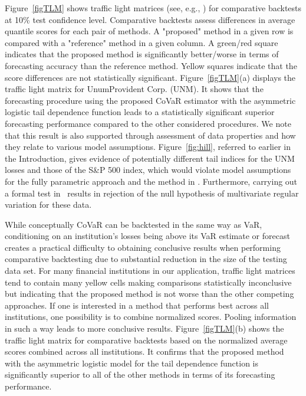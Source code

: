 \documentclass[11pt,letterpaper]{article}
\numberwithin{equation}{section}
\begin{document}
Figure~\ref{figTLM} shows traffic light matrices (see, e.g., \cite{NoldeZiegel2017}) for comparative backtests at 10\% test confidence level. Comparative backtests assess  differences in average quantile scores for each pair of methods. A "proposed" method in a given row is compared with a "reference" method in a given column. A green/red square indicates that the proposed method is significantly better/worse in terms of forecasting accuracy than the reference method. Yellow squares indicate that the score differences are not statistically significant. Figure~\ref{figTLM}(a) displays the traffic light matrix for UnumProvident Corp. (UNM). It shows that the forecasting procedure using the proposed CoVaR estimator with the asymmetric logistic tail dependence function leads to a statistically significant superior forecasting performance compared to the other considered procedures. We note that this result is also supported through assessment of data properties and how they relate to various model assumptions. Figure~\ref{fig:hill}, referred to earlier in the Introduction, gives evidence of potentially different tail indices for the UNM losses and those of the S\&P 500 index, which would violate model assumptions for the fully parametric approach and the method in \cite{NoldeZhang2018}. Furthermore, carrying out a formal test in~\cite{Einmahl_etal2021} results in rejection of the null hypothesis of multivariate regular variation for these data. 

While conceptually CoVaR can be backtested in the same way as VaR, conditioning on an institution's losses being above its VaR estimate or forecast creates a practical difficulty to obtaining conclusive results when performing comparative backtesting due to substantial reduction in the size of the testing data set. For many financial institutions in our application, traffic light matrices tend to contain many yellow cells making comparisons statistically inconclusive but indicating that the proposed method is not worse than the other competing approaches. If one is interested in a method that performs best across all institutions, one possibility is to combine normalized scores. Pooling information in such a way leads to more conclusive results. Figure~\ref{figTLM}(b) shows the traffic light matrix for comparative backtests based on the normalized average scores combined across all institutions. It confirms that the proposed method with the asymmetric logistic model for the tail dependence function is significantly superior to all of the other methods in terms of its forecasting performance.
\end{document}
